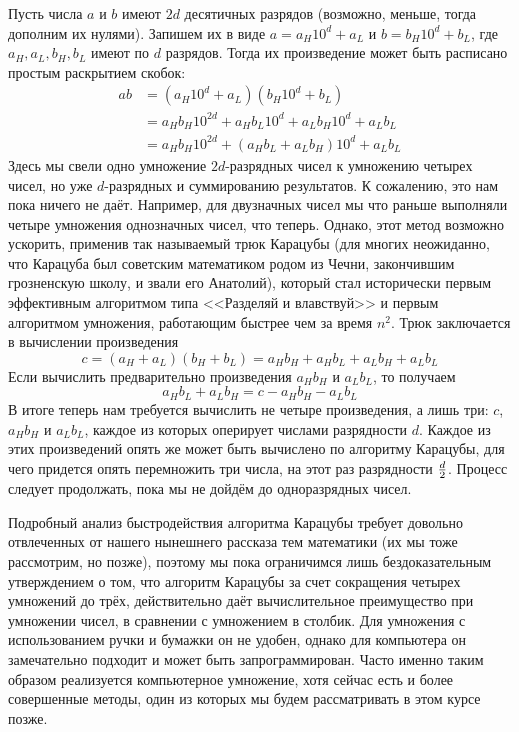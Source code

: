 Пусть числа $a$ и $b$ имеют $2d$ десятичных разрядов (возможно, меньше, тогда дополним их нулями). Запишем их в виде $a = a_H10^d + a_L$ и $b = b_H10^d + b_L$, где $a_H, a_L, b_H, b_L$ имеют по $d$ разрядов. Тогда их произведение может быть расписано простым раскрытием скобок:
\begin{align*}
ab &= (a_H10^d + a_L)(b_H10^d + b_L) \\
         &= a_Hb_H10^{2d} + a_Hb_L10^d + a_Lb_H10^d + a_Lb_L\\
         &= a_Hb_H10^{2d} + (a_Hb_L + a_Lb_H)10^d + a_Lb_L
\end{align*}
Здесь мы свели одно умножение $2d$-разрядных чисел к умножению четырех чисел, но уже $d$-разрядных и суммированию результатов. К сожалению, это нам пока ничего не даёт. Например, для двузначных чисел мы что раньше выполняли четыре умножения однозначных чисел, что теперь. Однако, этот метод возможно ускорить, применив так называемый трюк Карацубы (для многих неожиданно, что Карацуба был советским математиком родом из Чечни, закончившим грозненскую школу, и звали его Анатолий), который стал исторически первым эффективным алгоритмом типа <<Разделяй и влавствуй>> и первым алгоритмом умножения, работающим быстрее чем за время $n^2$. Трюк заключается в вычислении произведения
$$c = (a_H + a_L)(b_H + b_L) = a_Hb_H + a_Hb_L + a_Lb_H + a_Lb_L$$
Если вычислить предварительно произведения $a_Hb_H$ и $a_Lb_L$, то получаем
$$a_Hb_L + a_Lb_H = c - a_Hb_H - a_Lb_L$$
В итоге теперь нам требуется вычислить не четыре произведения, а лишь три: $c$, $a_Hb_H$ и $a_Lb_L$, каждое из которых оперирует числами разрядности $d$. Каждое из этих произведений опять же может быть вычислено по алгоритму Карацубы, для чего придется опять перемножить три числа, на этот раз разрядности $d \over 2$. Процесс следует продолжать, пока мы не дойдём до одноразрядных чисел.

Подробный анализ быстродействия алгоритма Карацубы требует довольно отвлеченных от нашего нынешнего рассказа тем математики (их мы тоже рассмотрим, но позже), поэтому мы пока ограничимся лишь бездоказательным утверждением о том, что алгоритм Карацубы за счет сокращения четырех умножений до трёх, действительно даёт вычислительное преимущество при умножении чисел, в сравнении с умножением в столбик. Для умножения с использованием ручки и бумажки он не удобен, однако для компьютера он замечательно подходит и может быть запрограммирован. Часто именно таким образом реализуется компьютерное умножение, хотя сейчас есть и более совершенные методы, один из которых мы будем рассматривать в этом курсе позже.

